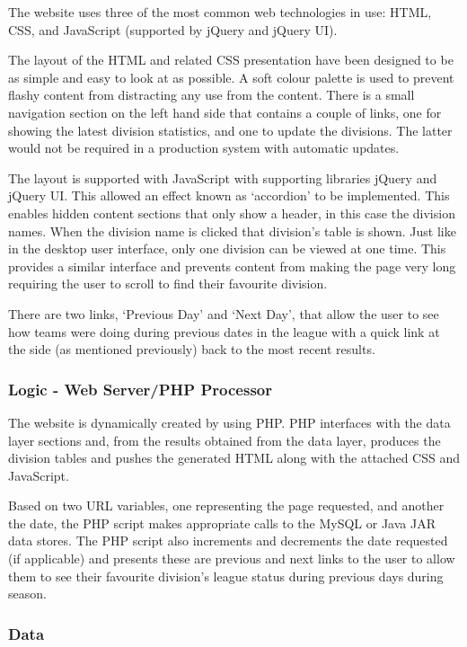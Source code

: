 The website uses three of the most common web technologies in use: HTML, CSS,
and JavaScript (supported by jQuery and jQuery UI).

The layout of the HTML and related CSS presentation have been designed to be
as simple and easy to look at as possible. A soft colour palette is used to
prevent flashy content from distracting any use from the content. There is
a small navigation section on the left hand side that contains a couple of
links, one for showing the latest division statistics, and one to update
the divisions. The latter would not be required in a production system with
automatic updates.

The layout is supported with JavaScript with supporting libraries jQuery and
jQuery UI. This allowed an effect known as `accordion' to be implemented. This
enables hidden content sections that only show a header, in this case the
division names. When the division name is clicked that division's table is
shown. Just like in the desktop user interface, only one division can be viewed
at one time. This provides a similar interface and prevents content from
making the page very long requiring the user to scroll to find their
favourite division.

There are two links, `Previous Day' and `Next Day', that allow the user to
see how teams were doing during previous dates in the league with a quick
link at the side (as mentioned previously) back to the most recent results.

\subsubsection{Logic - Web Server/PHP Processor}

The website is dynamically created by using PHP. PHP interfaces with
the data layer sections and, from the results obtained from the data layer,
produces the division tables and pushes the generated HTML along with the
attached CSS and JavaScript.

Based on two URL variables, one representing the page requested, and another
the date, the PHP script makes appropriate calls to the MySQL or Java JAR data
stores. The PHP script also increments and decrements the date requested (if
applicable) and presents these are previous and next links to the user to allow
them to see their favourite division's league status during previous days
during season.

\subsubsection{Data}

